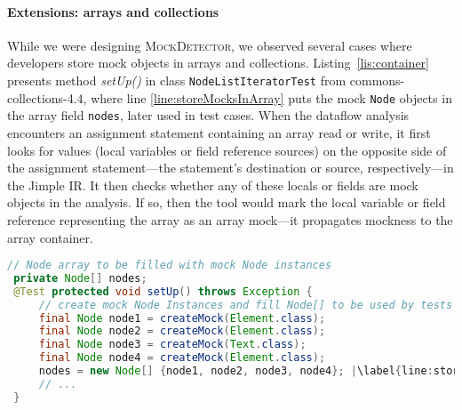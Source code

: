 \paragraph{Extensions: arrays and collections} While we were designing \textsc{MockDetector}, we observed several cases where developers store mock objects in arrays and collections. Listing~\ref{lis:container} presents method \textit{setUp()} in class \texttt{NodeListIteratorTest} from commons-collections-4.4, where line \ref{line:storeMocksInArray} puts the mock \texttt{Node} objects in the array field \texttt{nodes}, later used in test cases. When the dataflow analysis encounters an assignment statement containing an array read or write, it first looks for values (local variables or field reference sources) on the opposite side of the assignment statement---the statement's destination or source, respectively---in the Jimple IR. It then checks whether any of these locals or fields are mock objects in the analysis. If so, then the tool would mark the local variable or field reference representing the array as an array mock---it propagates mockness to the array container.

\begin{lstlisting}[basicstyle=\ttfamily, caption={This example illustrates a field array container holding mock \\ objects from \textit{setUp()} in \texttt{NodeListIteratorTest}.},
basicstyle=\scriptsize\ttfamily,language = Java, framesep=4.5mm, framexleftmargin=1.0mm, captionpos=b, label=lis:container, escapechar=|, morekeywords={@Test}]
 // Node array to be filled with mock Node instances
 private Node[] nodes;
 @Test protected void setUp() throws Exception {
     // create mock Node Instances and fill Node[] to be used by tests
     final Node node1 = createMock(Element.class);
     final Node node2 = createMock(Element.class);
     final Node node3 = createMock(Text.class);
     final Node node4 = createMock(Element.class);
     nodes = new Node[] {node1, node2, node3, node4}; |\label{line:storeMocksInArray}|
     // ...
 }
\end{lstlisting}

